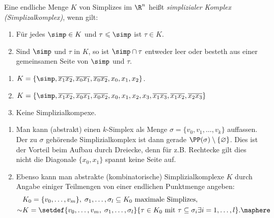 \begin{defn}
\label{defn:4.1.2}
Eine endliche Menge $K$ von Simplizes im $\R^n$ heißt \emph{simplizialer
Komplex (Simplizalkomplex)}, wenn gilt:
\begin{enumerate}[label=(\roman{*})]
  \item Für jedes $\simp\in K$ und $\tau\leqslant\simp$ ist $\tau\in K$.
  \item Sind $\simp$ und $\tau$ in $K$, so ist $\simp\cap\tau$ entweder leer
  oder besteth aus einer gemeinsamen Seite von $\simp$ und $\tau$.\fishhere
\end{enumerate}
\end{defn}
\begin{bspn}
\begin{enumerate}[label=\arabic{*}.)]
  \item $K=\{\simp, \overline{x_1x_2}, \overline{x_0x_1}, \overline{x_0x_2},
 x_0,x_1,x_2\}$.
 \item $K=\{\simp, \overline{x_1x_2}, \overline{x_0x_1}, \overline{x_0x_2},
 x_0,x_1,x_2, x_3, \overline{x_1x_3},\overline{x_1x_2},\overline{x_2x_3}\}$
 \item Keine Simplizialkompexe.\bsphere
\end{enumerate}
\end{bspn}

\begin{bem}
\label{bem:4.1.3}
\begin{enumerate}[label=\arabic{*}.)]
  \item Man kann (abstrakt) einen $k$-Simplex als Menge $\sigma
  =\{v_0,v_1,\ldots,v_k\}$ auffassen. Der zu $\sigma$ gehörende
  Simplizialkomplex ist dann gerade $\PP(\sigma)\setminus\{\varnothing\}$. Dies
  ist der Vorteil beim Aufbau durch Dreiecke, denn für z.B. Rechtecke gilt dies
  nicht
  die Diagonale $\{x_0,x_1\}$ spannt keine Seite auf.
  \item Ebenso kann man abstrakte (kombinatorische) Simplizialkomplexe $K$
  durch Angabe einiger Teilmengen von einer endlichen Punktmenge angeben:
  \begin{align*}
  &K_0 = \{v_0,\ldots,v_m\},\; \sigma_1,\ldots,\sigma_l\subseteq K_0
  \text{ maximale Simplizes},\\
  \sim & K=\setdef{v_0,\ldots,v_m,\;\sigma_1,\ldots,\sigma_l}{\tau\in K_0 \text{
  mit }\tau \subseteq \sigma_i \exists i=1,\ldots,l}.\maphere
  \end{align*}
\end{enumerate}
\end{bem}

